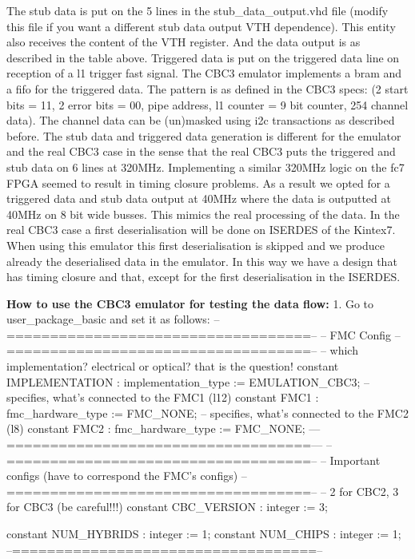 The stub data is put on the 5 lines in the stub_data_output.vhd file (modify this file if you want a different stub data output VTH dependence). This entity also receives the content of the VTH register. And the data output is as described in the table above.
Triggered data is put on the triggered data line on reception of a l1 trigger fast signal. The CBC3 emulator implements a bram and a fifo for the triggered data. The pattern is as defined in the CBC3 specs: (2 start bits = 11,  2 error bits = 00, pipe address, l1 counter = 9 bit counter, 254 channel data). The channel data can be (un)masked using i2c transactions as described before. 
The stub data and triggered data generation is different for the emulator and the real CBC3 case in the sense that the real CBC3 puts the triggered and stub data on 6 lines at 320MHz. Implementing a similar 320MHz logic on the fc7 FPGA seemed to result in timing closure problems. As a result we opted for a triggered data and stub data output at 40MHz where the data is outputted at 40MHz on 8 bit wide busses. This mimics the real processing of the data. In the real CBC3 case a first deserialisation will be done on ISERDES of the Kintex7. When using this emulator this first deserialisation is skipped and we produce already the deserialised data in the emulator. In this way we have a design that has timing closure and that, except for the first deserialisation in the ISERDES.




\textbf{How to use the CBC3 emulator for testing the data flow:}
1. Go to user_package_basic and set it as follows:
    --===================================--
        -- FMC Config
        --===================================--
        -- which implementation? electrical or optical? that is the question!
        constant IMPLEMENTATION         : implementation_type := EMULATION_CBC3;
        -- specifies, what's connected to the FMC1 (l12)
        constant FMC1                   : fmc_hardware_type := FMC_NONE;
        -- specifies, what's connected to the FMC2 (l8)
        constant FMC2                   : fmc_hardware_type := FMC_NONE;
        —===================================—
     --===================================--
        -- Important configs (have to correspond the FMC's configs)
        --===================================--
        -- 2 for CBC2, 3 for CBC3 (be careful!!!)
        constant CBC_VERSION            : integer := 3;     
    
        constant NUM_HYBRIDS            : integer := 1;
        constant NUM_CHIPS              : integer := 1;    
        --===================================--

